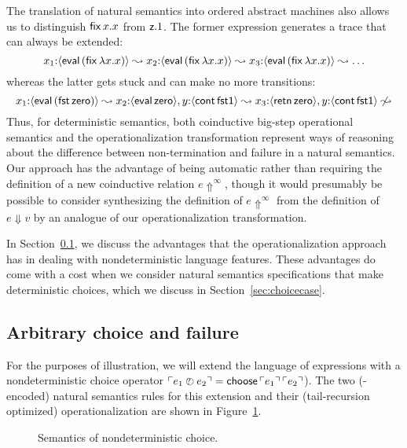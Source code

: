 The translation of natural semantics into ordered abstract machines
also allows us to distinguish ${\sf fix}\,x.x$ from ${\sf z}.1$.
The former expression generates a trace that can always be extended:
\[ x_1{:}\langle {{\sf eval}\,({\sf fix}\,\lambda x.x)} \rangle \leadsto
   x_2{:}\langle {{\sf eval}\,({\sf fix}\,\lambda x.x)} \rangle \leadsto
   x_3{:}\langle {{\sf eval}\,({\sf fix}\,\lambda x.x)} \rangle \leadsto \ldots 
\]whereas the latter gets stuck and can make no more transitions:\[ 
  x_1{:}\langle {{\sf eval}\,({\sf fst}\,{\sf zero})} \rangle \leadsto
  x_2{:}\langle {{\sf eval}\,{\sf zero}} \rangle, y{:}\langle {{\sf cont}\,{\sf fst1}} \rangle \leadsto
  x_3{:}\langle {{\sf retn}\,{\sf zero}} \rangle, y{:}\langle {{\sf cont}\,{\sf fst1}} \rangle 
  \not\leadsto
\]
Thus, for deterministic semantics, both coinductive big-step
operational semantics and the operationalization transformation
represent ways of reasoning about the difference between
non-termination and failure in a natural semantics. Our approach has
the advantage of being automatic rather than requiring the definition
of a new coinductive relation $e \Uparrow^\infty$, though it would
presumably be possible to consider synthesizing the definition of $e
\Uparrow^\infty$ from the definition of $e \Downarrow v$ by an
analogue of our operationalization transformation.

In Section~\ref{sec:choicefail}, we discuss the advantages that the
operationalization approach has in dealing with nondeterministic
language features. These advantages do come with a cost when 
we consider natural semantics specifications that make deterministic
choices, which we discuss in Section~\ref{sec:choicecase}.

\subsection{Arbitrary choice and failure}
\label{sec:choicefail}

For the purposes of illustration, we will extend the language of
expressions with a nondeterministic choice operator ${\ulcorner{e_1 \mathbin{\mbox{$\ocircle$\hspace{-7pt}{\footnotesize ?}\hspace{3pt}}}e_2}\urcorner} = {\sf choose}\,{\ulcorner{e_1}\urcorner}\,{\ulcorner{e_2}\urcorner}$).  The two
(\sls-encoded) natural semantics rules for this extension and their
(tail-recursion optimized) operationalization are shown in
Figure~\ref{fig:ns-arb}.

\begin{figure}[t]
\begin{minipage}[b]{0.45\linewidth}
\end{minipage}
\hspace{0.5cm}
\begin{minipage}[b]{0.55\linewidth}
\end{minipage}
\caption{Semantics of nondeterministic choice.}
\label{fig:ns-arb}
\end{figure}


